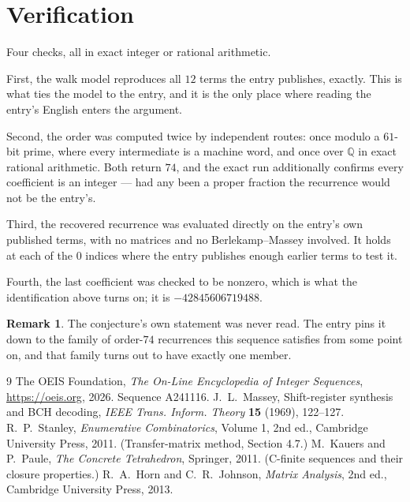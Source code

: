 \documentclass[11pt,a4paper]{article}
\theoremstyle{plain}
\theoremstyle{definition}
\newtheorem{remark}[theorem]{Remark}
\begin{document}
\section{Verification}

Four checks, all in exact integer or rational arithmetic.

First, the walk model reproduces all $12$ terms the entry publishes, exactly. This is
what ties the model to the entry, and it is the only place where reading the entry's English
enters the argument.

Second, the order was computed twice by independent routes: once modulo a $61$-bit prime, where
every intermediate is a machine word, and once over $\mathbb{Q}$ in exact rational arithmetic.
Both return $74$, and the exact run additionally confirms every coefficient is an integer
--- had any been a proper fraction the recurrence would not be the entry's.

Third, the recovered recurrence was evaluated directly on the entry's own published terms, with
no matrices and no Berlekamp--Massey involved. It holds at each of the $0$ indices where
the entry publishes enough earlier terms to test it.

Fourth, the last coefficient was checked to be nonzero, which is what the identification above
turns on; it is $-42845606719488$.

\begin{remark}
The conjecture's own statement was never read. The entry pins it down to the family of
order-$74$ recurrences this sequence satisfies from some point on, and that family turns
out to have exactly one member.
\end{remark}

\begin{thebibliography}{9}
 The OEIS Foundation, \emph{The On-Line Encyclopedia of Integer
Sequences}, \url{https://oeis.org}, 2026. Sequence A241116.
 J.~L.~Massey, Shift-register synthesis and BCH decoding, \emph{IEEE
Trans. Inform. Theory} \textbf{15} (1969), 122--127.
 R.~P.~Stanley, \emph{Enumerative Combinatorics}, Volume 1, 2nd ed.,
Cambridge University Press, 2011. (Transfer-matrix method, Section 4.7.)
 M.~Kauers and P.~Paule, \emph{The Concrete Tetrahedron}, Springer, 2011.
(C-finite sequences and their closure properties.)
 R.~A.~Horn and C.~R.~Johnson, \emph{Matrix Analysis}, 2nd ed., Cambridge
University Press, 2013.
\end{thebibliography}
\end{document}
